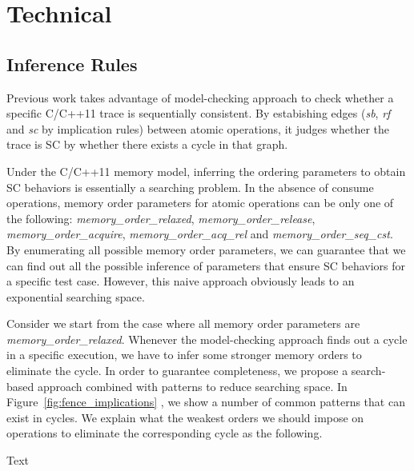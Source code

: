 \section{Technical}\label{sec:technical}

\subsection{Inference Rules}
Previous work takes advantage of model-checking approach to check whether a
specific C/C++11 trace is sequentially consistent. By estabishing edges
(\textit{sb}, \textit{rf} and \textit{sc} by implication rules) between atomic
operations, it judges whether the trace is SC by whether there exists a cycle in
that graph. 

Under the C/C++11 memory model, inferring the ordering parameters to obtain SC
behaviors is essentially a searching problem. In the absence of consume
operations, memory order parameters for atomic operations can be only one of the
following: \textit{memory\_order\_relaxed}, \textit{memory\_order\_release},
\textit{memory\_order\_acquire}, \textit{memory\_order\_acq\_rel} and
\textit{memory\_order\_seq\_cst}. By enumerating all possible memory order
parameters, we can guarantee that we can find out all the possible inference of
parameters that ensure SC behaviors for a specific test case. However, this
naive approach obviously leads to an exponential searching space.

Consider we start from the case where all memory order parameters are
\textit{memory\_order\_relaxed}. Whenever the model-checking approach finds out
a cycle in a specific execution, we have to infer some stronger memory orders to
eliminate the cycle. In order to guarantee completeness, we propose a
search-based approach combined with patterns to reduce searching space.  In
Figure~\ref{fig:fence_implications} , we show a number of common patterns that
can exist in cycles. We explain what the weakest orders we should impose on
operations to eliminate the corresponding cycle as the following.


Text 







